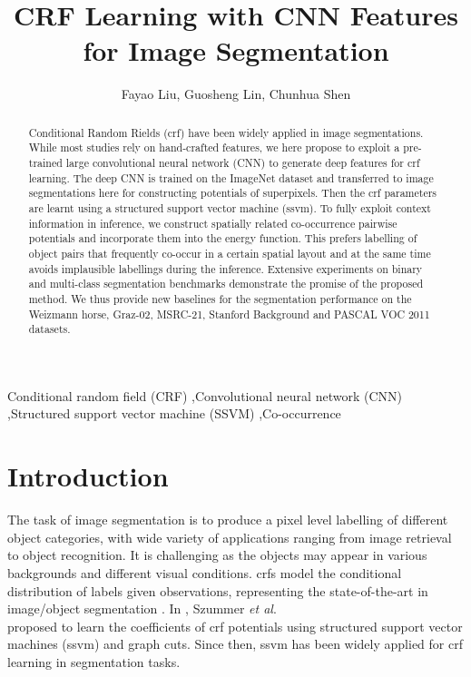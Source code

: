\documentclass[10pt,3p]{elsarticle}
\def\onedot{.\xspace}
\def\etal{\emph{et al}\onedot}
\newcommand{\ssvm}{{\sc ssvm}\xspace}
\newcommand{\crf}{{\sc crf}\xspace}
\newcommand{\crfs}{{\sc crf}s\xspace}
\begin{document}
\begin{frontmatter}

\title{CRF Learning with CNN Features for Image Segmentation}


\author{Fayao Liu, Guosheng Lin, Chunhua Shen}
\address{School of Computer Science, The University of Adelaide, Australia}



\begin{abstract}
Conditional Random Rields (\crf) have been widely applied in image segmentations. While most studies rely on hand-crafted features,
we here propose to exploit a pre-trained large convolutional neural network (CNN) to generate deep features for \crf learning. The deep CNN is trained on the ImageNet dataset and transferred to image segmentations here for constructing potentials of superpixels.
Then the \crf parameters are learnt using a structured support vector machine (\ssvm).
To fully exploit context information in inference, we construct spatially related co-occurrence pairwise potentials and incorporate them into the energy function. This prefers labelling of object pairs that frequently co-occur in a certain spatial layout and at the same time avoids implausible  labellings during the inference.
Extensive experiments on binary and multi-class segmentation benchmarks demonstrate the promise of the proposed method.
We thus provide new baselines for the segmentation performance on
the Weizmann horse, Graz-02, MSRC-21, Stanford Background and PASCAL VOC 2011 datasets.
\end{abstract}

\begin{keyword}
Conditional random field (CRF) \sep Convolutional neural network (CNN) \sep Structured support vector machine (SSVM) \sep Co-occurrence
\end{keyword}

\end{frontmatter}






\section{Introduction}
\label{sec:intro}
The task of image segmentation is to produce a pixel level labelling of different
object categories, with wide variety of applications ranging from image retrieval to object recognition.
It is challenging as the objects may appear in various backgrounds and
different visual conditions.
\crfs \cite{Lafferty01Conditional}
model the conditional distribution of labels given observations, representing the state-of-the-art
in image/object segmentation  \cite{SzummerKH08,Shotton08,Fulkerson09,Lucchi12,NowozinGL10}.
In \cite{SzummerKH08}, Szummer \etal \\proposed to learn the coefficients of \crf potentials using structured support vector machines (\ssvm) and graph cuts. Since then, \ssvm has been widely applied for \crf learning in segmentation tasks.
\end{document}
